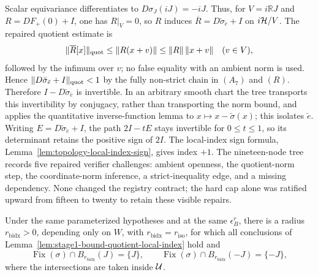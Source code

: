 Scalar equivariance differentiates to $D\sigma_J(iJ)=-iJ$.  Thus, for
$V=i\mathbb RJ$ and $R=DF_+(0)+I$, one has $R|_V=0$, so $R$ induces
$\overline R=D\breve\sigma_{\breve e}+I$ on $i\mathcal H/V$.  The repaired quotient estimate is
\[
 \lVert \overline R[x]\rVert_{\mathrm{quot}}
 \le \lVert R(x+v)\rVert\le\lVert R\rVert\,\lVert x+v\rVert\quad(v\in V),
\]
followed by the infimum over $v$; no false equality with an ambient norm is used.  Hence
$\lVert D\breve\sigma_{\breve e}+I\rVert_{\mathrm{quot}}<1$ by the fully non-strict chain in
$(A_7)$ and $(R)$.  Therefore $I-D\breve\sigma_{\breve e}$ is invertible.  In an arbitrary
smooth chart the tree transports this invertibility by conjugacy, rather than transporting
the norm bound, and applies the quantitative inverse-function lemma to
$x\mapsto x-\breve\sigma(x)$; this isolates $\breve e$.
Writing $E=D\breve\sigma_{\breve e}+I$, the path $2I-tE$ stays invertible for
$0\le t\le1$, so its determinant retains the positive sign of $2I$.  The local-index sign
formula, Lemma~\ref{lem:topology-local-index-sign}, gives index $+1$.  The nineteen-node
tree records five repaired verifier challenges: ambient openness, the quotient-norm step,
the coordinate-norm inference, a strict-inequality edge, and a missing dependency.  None
changed the registry contract; the hard cap alone was ratified upward from fifteen to
twenty to retain these visible repairs.

\begin{lemma}\label{lem:stage1-bound-inversion-isolation}
Under the same parameterized hypotheses and at the same $\epsilon_B^r$, there is a radius
$r_{\mathrm{bidx}}>0$, depending only on $W$, with
$r_{\mathrm{bidx}}=r_{\mathrm{iso}}$, for which all conclusions of
Lemma~\ref{lem:stage1-bound-quotient-local-index} hold and
\[
 \operatorname{Fix}(\sigma)\cap B_{r_{\mathrm{bidx}}}(J)=\{J\},
 \qquad
 \operatorname{Fix}(\sigma)\cap B_{r_{\mathrm{bidx}}}(-J)=\{-J\},
\]
where the intersections are taken inside $\mathcal U$.
\end{lemma}

